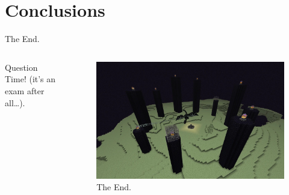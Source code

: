 \documentclass[english]{beamer}
\begin{document}
\section{Conclusions}
\begin{frame}{The End.}

  \begin{columns}
    
    \begin{column}{0.4\textwidth}
      Question Time! (it's an exam after all\dots).
    \end{column}
    
    \begin{column}{0.6\textwidth}
      \begin{figure}
        \centering
            \includegraphics[width=1.0\textwidth]{images/The_End.jpg}
            \caption{The End.}
        \end{figure}
    \end{column}

  \end{columns}

\end{frame}
\end{document}
